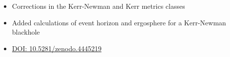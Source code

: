 \documentclass[10pt,a4paper,ragged2e,withhyper]{altacv}
\begin{document}
\begin{paracol}{2}
\begin{itemize}
\begin{itemize}
        \item Corrections in the Kerr-Newman and Kerr metrics classes
        \item Added calculations of event horizon and ergosphere for a Kerr-Newman blackhole %
        \item \href{https://doi.org/10.5281/zenodo.4445219
}{DOI: 10.5281/zenodo.4445219}
    \end{itemize}
\end{itemize}
\nocite{*}
\printbibliography[heading=pubtype,title={\printinfo{\faFile*[regular]}{Journal Articles}}, type=misc]
\end{paracol}
\end{document}
